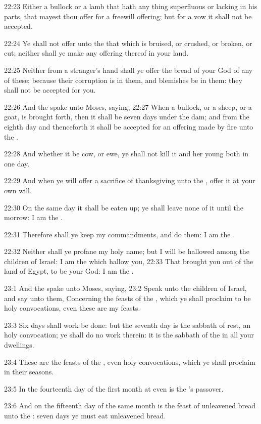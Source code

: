 22:23 Either a bullock or a lamb that hath any thing superfluous or
lacking in his parts, that mayest thou offer for a freewill offering;
but for a vow it shall not be accepted.

22:24 Ye shall not offer unto the \LORD that which is bruised, or
crushed, or broken, or cut; neither shall ye make any offering thereof
in your land.

22:25 Neither from a stranger's hand shall ye offer the bread of your
God of any of these; because their corruption is in them, and
blemishes be in them: they shall not be accepted for you.

22:26 And the \LORD spake unto Moses, saying, 22:27 When a bullock, or
a sheep, or a goat, is brought forth, then it shall be seven days
under the dam; and from the eighth day and thenceforth it shall be
accepted for an offering made by fire unto the \LORD.

22:28 And whether it be cow, or ewe, ye shall not kill it and her
young both in one day.

22:29 And when ye will offer a sacrifice of thanksgiving unto the
\LORD, offer it at your own will.

22:30 On the same day it shall be eaten up; ye shall leave none of it
until the morrow: I am the \LORD.

22:31 Therefore shall ye keep my commandments, and do them: I am the
\LORD.

22:32 Neither shall ye profane my holy name; but I will be hallowed
among the children of Israel: I am the \LORD which hallow you, 22:33
That brought you out of the land of Egypt, to be your God: I am the
\LORD.

23:1 And the \LORD spake unto Moses, saying, 23:2 Speak unto the
children of Israel, and say unto them, Concerning the feasts of the
\LORD, which ye shall proclaim to be holy convocations, even these are
my feasts.

23:3 Six days shall work be done: but the seventh day is the sabbath
of rest, an holy convocation; ye shall do no work therein: it is the
sabbath of the \LORD in all your dwellings.

23:4 These are the feasts of the \LORD, even holy convocations, which
ye shall proclaim in their seasons.

23:5 In the fourteenth day of the first month at even is the \LORD's
passover.

23:6 And on the fifteenth day of the same month is the feast of
unleavened bread unto the \LORD: seven days ye must eat unleavened
bread.


